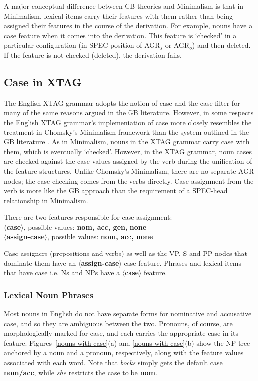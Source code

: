 A major conceptual difference between GB theories and Minimalism is that in
Minimalism, lexical items carry their features with them rather than being
assigned their features in the course of the derivation.  For example, nouns
have a case feature when it comes into the derivation. This feature is
`checked' in a particular configuration (in SPEC position of AGR$_s$ or
AGR$_o$) and then deleted. If the feature is not checked
(deleted), the derivation fails.\cite{chomsky92}

\subsection{Case in XTAG}

The English XTAG grammar adopts the notion of case and the case filter for many
of the same reasons argued in the GB literature.  However, in some respects the
English XTAG grammar's implementation of case more closely resembles the
treatment in Chomsky's Minimalism framework \cite{chomsky92} than the system
outlined in the GB literature \cite{chomsky86}.  As in Minimalism, nouns in
the XTAG grammar carry case with them, which is eventually `checked'. However,
in the XTAG grammar, noun cases are checked against the case values assigned
by the verb during the unification of the feature structures.  Unlike Chomsky's
Minimalism, there are no separate AGR nodes; the case checking comes from the
verbs directly. Case assignment from the verb is more like the GB approach than
the requirement of a SPEC-head relationship in Minimalism.

There are two features responsible for case-assignment:\\
{\bf $\langle$case$\rangle$}, possible values: {\bf nom, acc, gen, none}\\
{\bf $\langle$assign-case$\rangle$}, possible values: {\bf nom, acc, none}

Case assigners (prepositions and verbs) as well as the VP, S and PP
nodes that dominate them have an {\bf $\langle$assign-case$\rangle$}
case feature. Phrases and lexical items that have case i.e. Ns and NPs
have a {\bf $\langle$case$\rangle$} feature.

\subsubsection{Lexical Noun Phrases}

Most nouns in English do not have separate forms for nominative and accusative
case, and so they are ambiguous between the two.  Pronouns, of course, are
morphologically marked for case, and each carries the appropriate case in its
feature.  Figures~\ref{nouns-with-case}(a) and \ref{nouns-with-case}(b) show
the NP tree anchored by a noun and a pronoun, respectively, along with the
feature values associated with each word.  Note that {\it books} simply gets
the default case {\bf nom/acc}, while {\it she} restricts the case to be {\bf
nom}.


